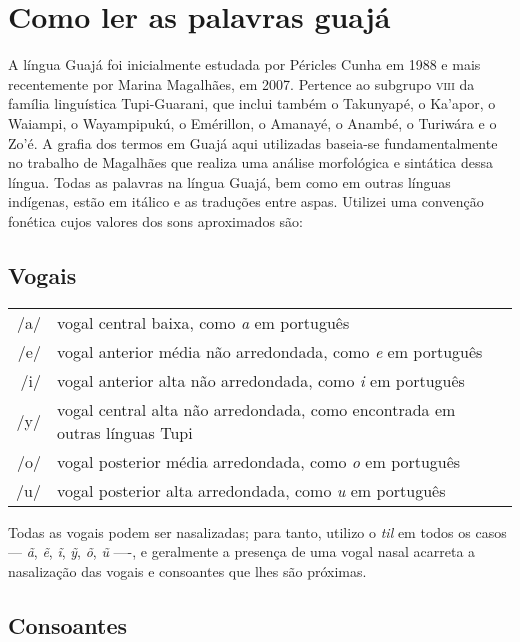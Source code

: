 \chapter{Como ler as palavras guajá}


A língua Guajá foi inicialmente estudada por Péricles Cunha em 1988 e
mais recentemente por Marina Magalhães, em 2007. Pertence ao
subgrupo \textsc{viii} da família linguística Tupi-Guarani, que inclui também o
Takunyapé, o Ka'apor, o Waiampi, o Wayampipukú, o Emérillon, o Amanayé,
o Anambé, o Turiwára e o Zo'é. %
A grafia dos termos em Guajá aqui utilizadas baseia-se fundamentalmente no
trabalho de Magalhães que realiza uma análise morfológica e
sintática dessa língua. Todas as palavras na língua Guajá, bem como em
outras línguas indígenas, estão em itálico e as traduções entre aspas.
Utilizei uma convenção fonética cujos valores dos sons aproximados são:

\section{Vogais}

\begin{tabular}{rl}
/a/ & vogal central baixa, como \textit{a} em português\\
/e/ & vogal anterior média não arredondada, como \textit{e} em português\\
/i/ & vogal anterior alta não arredondada, como \textit{i} em português\\
/y/ & vogal central alta não arredondada, como encontrada em outras línguas Tupi\\
/o/ & vogal posterior média arredondada, como \textit{o} em português\\
/u/ & vogal posterior alta arredondada, como \textit{u} em português
\end{tabular} 


Todas as vogais podem ser nasalizadas; para tanto, utilizo o \textit{til} em
todos os casos --- \textit{ã}, \textit{ẽ}, \textit{ĩ}, \textit{ỹ}, \textit{õ}, \textit{ũ} ----, e geralmente a presença de uma
vogal nasal acarreta a nasalização das vogais e consoantes que lhes são
próximas.

\section{Consoantes}

